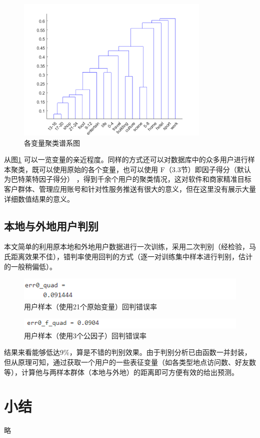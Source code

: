\documentclass[UTF8]{ctexart}
\begin{document}
		\begin{figure}[H]
			\centering
			\includegraphics[scale=0.6]{group.png}
			\caption{各变量聚类谱系图}
			\label{group}
		\end{figure}
		
		从图\ref{group} 可以一览变量的亲近程度。同样的方式还可以对数据库中的众多用户进行样本聚类，既可以使用原始的各个变量，也可以使用 F（3.3节）即因子得分（默认为巴特莱特因子得分） ，得到千余个用户的聚类情况，这对软件和商家精准目标客户群体、管理应用账号和针对性服务推送有很大的意义，但在这里没有展示大量详细数值结果的意义。
		
		\subsection{本地与外地用户判别}
		本文简单的利用原本地和外地用户数据进行一次训练，采用二次判别（经检验，马氏距离效果不佳），错判率使用回判的方式（逐一对训练集中样本进行判别，估计的一般稍偏低）。
		
		\begin{figure}[H]
			\centering
			\includegraphics{err_quad.png}
			\caption{用户样本（使用21个原始变量）回判错误率}
			\label{err}
		\end{figure}
		\begin{figure}[H]
			\centering
			\includegraphics{err_f.png}
			\caption{用户样本（使用3个公因子）回判错误率}
			\label{err_f}
		\end{figure}
		
		结果来看能够低达9\%，算是不错的判别效果。由于判别分析已由函数一并封装，但从原理可知，通过获取一个用户的一些表征变量（如各类型地点访问数、好友数等），计算他与两样本群体（本地与外地）的距离即可方便有效的给出预测。
		
	\section{小结}
	略
	
\end{document}
